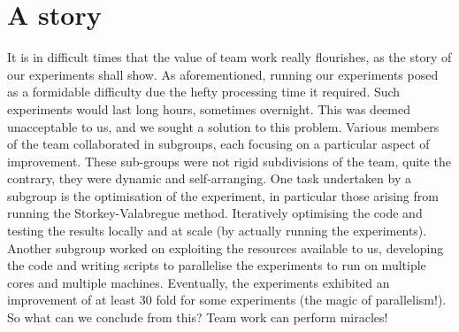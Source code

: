 \section{A story}
It is in difficult times that the value of team work really flourishes, as the story of our experiments shall show. As aforementioned, running our experiments posed as a formidable difficulty due the hefty processing time it required. Such experiments would last long hours, sometimes overnight. This was deemed unacceptable to us, and we sought a solution to this problem. Various members of the team collaborated in subgroups, each focusing on a particular aspect of improvement. These sub-groups were not rigid subdivisions of the team, quite the contrary, they were dynamic and self-arranging. One task undertaken by a subgroup is the optimisation of the experiment, in particular those arising from running the Storkey-Valabregue method. Iteratively optimising the code and testing the results locally and at scale (by actually running the experiments). Another subgroup worked on exploiting the resources available to us, developing the code and writing scripts to parallelise the experiments to run on multiple cores and multiple machines. Eventually, the experiments exhibited an improvement of at least 30 fold for some experiments (the magic of parallelism!). So what can we conclude from this? Team work can perform miracles!
